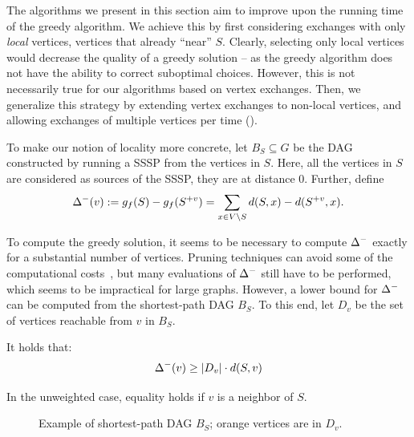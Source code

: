 The algorithms we present in this section aim to improve upon the running time
of the greedy algorithm. We achieve this by first considering exchanges with
only \emph{local} vertices, \ie vertices that already \enquote{near} $S$.
Clearly, selecting only local vertices would decrease the quality of a greedy solution --
as the greedy algorithm does not have the ability to correct suboptimal choices.
However, this is not necessarily true for our algorithms based on vertex exchanges.
Then, we generalize this strategy by extending vertex exchanges to non-local vertices,
and allowing exchanges of multiple vertices per time
().

To make our notion of locality more concrete, let $B_S \subseteq G$ be the DAG
constructed by running a SSSP from the vertices in $S$. Here, all the vertices
in $S$ are considered as sources of the SSSP, \ie they are at distance 0.
Further, define
%
\[
\Delta^-(v) :=
g_f(S) - g_f(S^{+v}) = \sum_{x\in V\setminus S}d(S, x) - d(S^{+v}, x).
\]

To compute the greedy solution, it seems to be necessary to compute $\Delta^-$
exactly for a substantial number of vertices. Pruning techniques can avoid some of the
computational costs~\cite{DBLP:conf/alenex/BergaminiGM18}, but many evaluations of
$\Delta^-$ still have to be performed, which seems to be impractical for
large graphs. However, a lower bound for $\Delta^-$ can be computed from the
shortest-path DAG $B_S$. To this end, let $D_v$ be the set of vertices
reachable from $v$ in $B_S$.

\begin{lemma}
\label{lemma:delta-group-farness}
 It holds that:
%
\[\Delta^-(v) \ge |D_v| \cdot d(S, v)\]

In the unweighted case, equality holds if $v$ is a neighbor of $S$.
\end{lemma}

\begin{figure}[t]
\centering

\caption{Example of shortest-path DAG $B_S$; orange vertices are
in $D_v$.}
\label{fig:lsh-gc:dag}
\end{figure}

